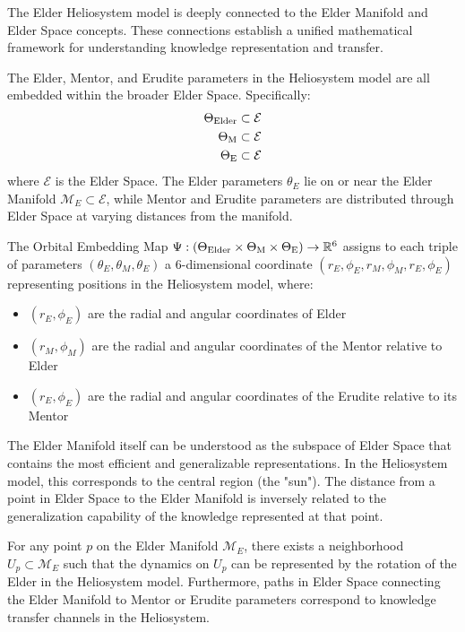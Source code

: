 The Elder Heliosystem model is deeply connected to the Elder Manifold and Elder Space concepts. These connections establish a unified mathematical framework for understanding knowledge representation and transfer.

\begin{theorem}
The Elder, Mentor, and Erudite parameters in the Heliosystem model are all embedded within the broader Elder Space. Specifically:
\begin{align}
\Theta_{\text{Elder}} &\subset \mathcal{E}\\
\Theta_{\text{M}} &\subset \mathcal{E}\\
\Theta_{\text{E}} &\subset \mathcal{E}
\end{align}
where $\mathcal{E}$ is the Elder Space. The Elder parameters $\theta_E$ lie on or near the Elder Manifold $\mathcal{M}_E \subset \mathcal{E}$, while Mentor and Erudite parameters are distributed through Elder Space at varying distances from the manifold.
\end{theorem}

\begin{definition}
The Orbital Embedding Map $\Psi: (\Theta_{\text{Elder}} \times \Theta_{\text{M}} \times \Theta_{\text{E}}) \rightarrow \mathbb{R}^6$ assigns to each triple of parameters $(\theta_E, \theta_M, \theta_E)$ a 6-dimensional coordinate $(r_E, \phi_E, r_M, \phi_M, r_{E}, \phi_{E})$ representing positions in the Heliosystem model, where:
\begin{itemize}
    \item $(r_E, \phi_E)$ are the radial and angular coordinates of Elder
    \item $(r_M, \phi_M)$ are the radial and angular coordinates of the Mentor relative to Elder
    \item $(r_{E}, \phi_{E})$ are the radial and angular coordinates of the Erudite relative to its Mentor
\end{itemize}
\end{definition}

The Elder Manifold itself can be understood as the subspace of Elder Space that contains the most efficient and generalizable representations. In the Heliosystem model, this corresponds to the central region (the "sun"). The distance from a point in Elder Space to the Elder Manifold is inversely related to the generalization capability of the knowledge represented at that point.

\begin{theorem}
For any point $p$ on the Elder Manifold $\mathcal{M}_E$, there exists a neighborhood $U_p \subset \mathcal{M}_E$ such that the dynamics on $U_p$ can be represented by the rotation of the Elder in the Heliosystem model. Furthermore, paths in Elder Space connecting the Elder Manifold to Mentor or Erudite parameters correspond to knowledge transfer channels in the Heliosystem.
\end{theorem}

